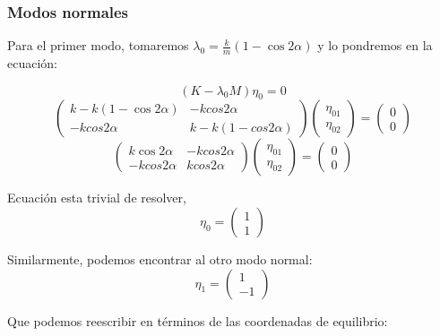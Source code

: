\documentclass[a4paper,12pt]{article}
\begin{document}
\subsubsection*{Modos normales}

Para el primer modo, tomaremos $\lambda_0 =  \frac{k}{m} (1 - \cos{2\alpha})$ y lo pondremos en la ecuación:

$$(K-\lambda_0 M)\eta_0 = 0$$
\begin{equation*}
  \begin{pmatrix}
    k - k(1-\cos{2\alpha}) & -kcos{2\alpha}\\
    -kcos{2\alpha} & k - k (1-cos{2\alpha})
  \end{pmatrix}
  \begin{pmatrix}
    \eta_{01}\\
    \eta_{02}
  \end{pmatrix} = \begin{pmatrix}
    0 \\ 0
  \end{pmatrix}
\end{equation*}
\begin{equation*}
  \begin{pmatrix}
      k\cos{2\alpha} & -kcos{2\alpha}\\
    -kcos{2\alpha} &  kcos{2\alpha}
  \end{pmatrix}
  \begin{pmatrix}
    \eta_{01}\\
    \eta_{02}
  \end{pmatrix} = \begin{pmatrix}
    0 \\ 0
  \end{pmatrix}
\end{equation*}

Ecuación esta trivial de resolver, 
\begin{equation}
  \eta_0 = \begin{pmatrix}
    1\\1
  \end{pmatrix}
\end{equation}

Similarmente, podemos encontrar al otro modo normal:
\begin{equation}
  \eta_1 = \begin{pmatrix}
    1\\-1
  \end{pmatrix}
\end{equation}

Que podemos reescribir en términos de las coordenadas de equilibrio:
\end{document}
